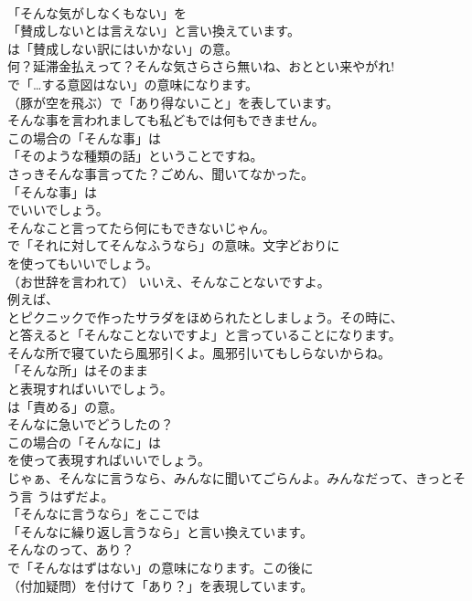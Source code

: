 \documentclass[8pt]{extreport}
\begin{document}
\begin{CJK}{UTF8}{min}
\\	「そんな気がしなくもない」を
\\	「賛成しないとは言えない」と言い換えています。
\\	は「賛成しない訳にはいかない」の意。	
\\	何？延滞金払えって？そんな気さらさら無いね、おととい来やがれ! 
\\	で「…する意図はない」の意味になります。
\\	（豚が空を飛ぶ）で「あり得ないこと」を表しています。	
\\	そんな事を言われましても私どもでは何もできません。 
\\	この場合の「そんな事」は
\\	「そのような種類の話」ということですね。	
\\	さっきそんな事言ってた？ごめん、聞いてなかった。 
\\	「そんな事」は
\\	でいいでしょう。	
\\	そんなこと言ってたら何にもできないじゃん。 
\\	で「それに対してそんなふうなら」の意味。文字どおりに 
\\	を使ってもいいでしょう。	
\\	（お世辞を言われて） いいえ、そんなことないですよ。 
\\	例えば、
\\	とピクニックで作ったサラダをほめられたとしましょう。その時に、
\\	と答えると「そんなことないですよ」と言っていることになります。	
\\	そんな所で寝ていたら風邪引くよ。風邪引いてもしらないからね。 
\\	「そんな所」はそのまま 
\\	と表現すればいいでしょう。
\\	は「責める」の意。	
\\	そんなに急いでどうしたの？ 
\\	この場合の「そんなに」は
\\	を使って表現すればいいでしょう。	
\\	じゃぁ、そんなに言うなら、みんなに聞いてごらんよ。みんなだって、きっとそう言 うはずだよ。 
\\	「そんなに言うなら」をここでは
\\	「そんなに繰り返し言うなら」と言い換えています。	
\\	そんなのって、あり？ 
\\	で「そんなはずはない」の意味になります。この後に
\\	（付加疑問）を付けて「あり？」を表現しています。	

\end{CJK}
\end{document}
